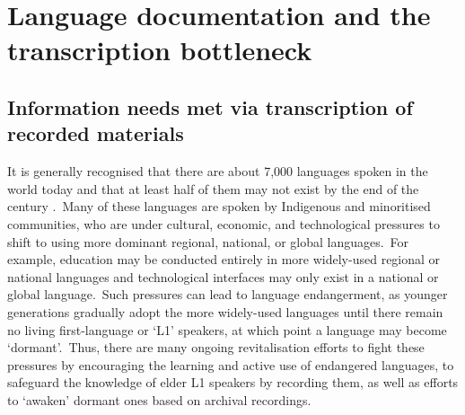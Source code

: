 \documentclass[main.tex]{subfiles}
\begin{document}
\section{Language documentation and the transcription bottleneck}


\subsection{Information needs met via transcription of recorded materials}
\label{sec:info-needs}

It is generally recognised that there are about 7,000 languages spoken in the world today and that at least half of them may not exist by the end of the century \parencite{austin2011cambridge}.~Many of these languages are spoken by Indigenous and minoritised communities, who are under cultural, economic, and technological pressures to shift to using more dominant regional, national, or global languages.~For example, education may be conducted entirely in more widely-used regional or national languages and technological interfaces may only exist in a national or global language.~Such pressures can lead to language endangerment, as younger generations gradually adopt the more widely-used languages until there remain no living first-language or `L1' speakers, at which point a language may become `dormant'.~Thus, there are many ongoing revitalisation efforts to fight these pressures by encouraging the learning and active use of endangered languages, to safeguard the knowledge of elder L1 speakers by recording them, as well as efforts to ‘awaken’ dormant ones based on archival recordings.
\end{document}

